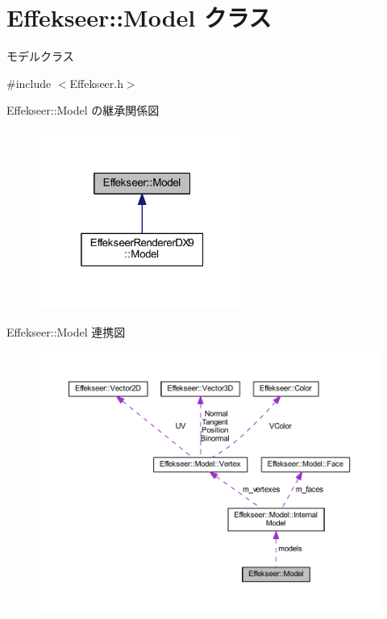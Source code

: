 \hypertarget{class_effekseer_1_1_model}{}\section{Effekseer\+:\+:Model クラス}
\label{class_effekseer_1_1_model}


モデルクラス  




{\ttfamily \#include $<$Effekseer.\+h$>$}



Effekseer\+:\+:Model の継承関係図\nopagebreak
\begin{figure}[H]
\begin{center}
\leavevmode
\includegraphics[width=193pt]{class_effekseer_1_1_model__inherit__graph}
\end{center}
\end{figure}


Effekseer\+:\+:Model 連携図\nopagebreak
\begin{figure}[H]
\begin{center}
\leavevmode
\includegraphics[width=350pt]{class_effekseer_1_1_model__coll__graph}
\end{center}
\end{figure}
